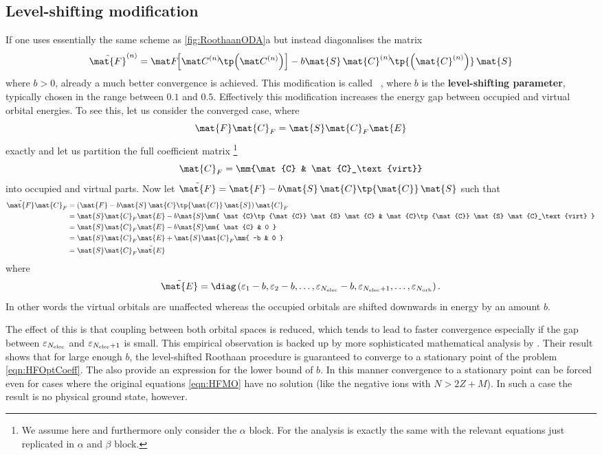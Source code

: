 \subsection{Level-shifting modification}
If one uses essentially the same \SCF scheme as \ref{fig:RoothaanODA}a
but instead diagonalises the matrix
\[ \tilde{\mat{F}}^{(n)} = \matFnfull
	- b \mat{S} \, \mat{C}^{(n)}\!\tp{\left(\mat{C}^{(n)}\right)} \, \mat{S} \]
where $b > 0$,
already a much better convergence is achieved.
This modification is called %
~\cite{Saunders1973,Guest1974},
where $b$ is the \textbf{level-shifting parameter},
typically chosen in the range between $0.1$ and $0.5$.
Effectively this modification increases the energy gap between occupied and virtual
orbital energies.
To see this, let us consider the converged case, where
\[ \mat{F} \mat{C}_F = \mat{S} \mat{C}_F \mat{E} \]
exactly and let us partition the full coefficient matrix%
\footnote{We assume \RHF here and furthermore only consider the $\alpha$ block.
	For \UHF the analysis is exactly the same with
	the relevant equations just replicated in $\alpha$ and $\beta$ block.}
\[
	\mat{C}_F = \mm{\mat{C} & \mat{C}_\text{virt}}
\]
into occupied and virtual parts.
Now let $\tilde{\mat{F}} = \mat{F} - b \mat{S} \, \mat{C}\tp{\mat{C}} \, \mat{S}$
such that
\begin{align*}
	\tilde{\mat{F}} \mat{C}_F
	&= \left( \mat{F} - b \mat{S} \, \mat{C}\tp{\mat{C}} \, \mat{S} \right) \mat{C}_F \\
	&= \mat{S} \mat{C}_F \mat{E} - b \mat{S} \mm{
		\mat{C}\tp{\mat{C}} \mat{S} \mat{C} &
		\mat{C}\tp{\mat{C}} \mat{S} \mat{C}_\text{virt}
	} \\
	&= \mat{S} \mat{C}_F \mat{E} - b \mat{S} \mm{ \mat{C} & 0 } \\
	&= \mat{S} \mat{C}_F \mat{E} + \mat{S} \mat{C}_F \mm{ -b  & 0 } \\
	&= \mat{S} \mat{C}_F \tilde{\mat{E}}
\end{align*}
where
\[ \tilde{\mat{E}} = \diag\left(\varepsilon_1 - b, \varepsilon_2 - b, \ldots,
	\varepsilon_{\Nelec} - b, \varepsilon_{\Nelec+1}, \ldots, \varepsilon_{\Norb}\right).
\]
In other words the virtual orbitals are unaffected
whereas the occupied orbitals are shifted downwards in energy by an amount $b$.

The effect of this is that coupling between both orbital spaces is reduced,
which tends to lead to faster convergence
especially if the gap between $\varepsilon_{N_\text{elec}}$ and $\varepsilon_{N_\text{elec}+1}$ is small.
This empirical observation is backed up by more sophisticated
mathematical analysis by \citet{Cances2000b}.
Their result shows that for large enough $b$,
the level-shifted Roothaan procedure is guaranteed to converge to a stationary
point of the \HF problem \eqref{eqn:HFOptCoeff}.
The also provide an expression for the lower bound of $b$.
In this manner convergence to a stationary point
can be forced even for cases where the original \HF equations \eqref{eqn:HFMO}
have no solution (like the negative ions with $N > 2Z + M$).
In such a case the result is no physical ground state, however.

